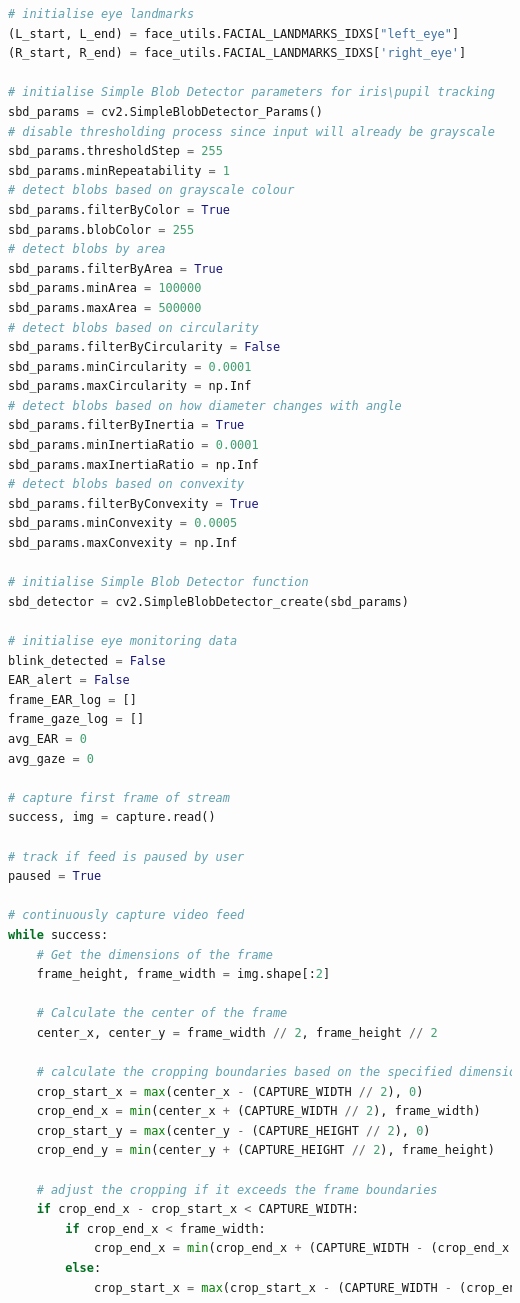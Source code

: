 \documentclass[10pt,conference]{IEEEtran}
\begin{document}
\begin{lstlisting}[language=Python,basicstyle=\tiny, showspaces=false, showstringspaces=false tabsize=1, breaklines=true]
# initialise eye landmarks
(L_start, L_end) = face_utils.FACIAL_LANDMARKS_IDXS["left_eye"]
(R_start, R_end) = face_utils.FACIAL_LANDMARKS_IDXS['right_eye']

# initialise Simple Blob Detector parameters for iris\pupil tracking
sbd_params = cv2.SimpleBlobDetector_Params()
# disable thresholding process since input will already be grayscale
sbd_params.thresholdStep = 255
sbd_params.minRepeatability = 1
# detect blobs based on grayscale colour
sbd_params.filterByColor = True
sbd_params.blobColor = 255
# detect blobs by area
sbd_params.filterByArea = True
sbd_params.minArea = 100000
sbd_params.maxArea = 500000
# detect blobs based on circularity
sbd_params.filterByCircularity = False
sbd_params.minCircularity = 0.0001
sbd_params.maxCircularity = np.Inf
# detect blobs based on how diameter changes with angle
sbd_params.filterByInertia = True
sbd_params.minInertiaRatio = 0.0001
sbd_params.maxInertiaRatio = np.Inf
# detect blobs based on convexity
sbd_params.filterByConvexity = True
sbd_params.minConvexity = 0.0005
sbd_params.maxConvexity = np.Inf

# initialise Simple Blob Detector function
sbd_detector = cv2.SimpleBlobDetector_create(sbd_params)

# initialise eye monitoring data
blink_detected = False
EAR_alert = False
frame_EAR_log = []
frame_gaze_log = []
avg_EAR = 0
avg_gaze = 0

# capture first frame of stream
success, img = capture.read()

# track if feed is paused by user
paused = True

# continuously capture video feed
while success:
    # Get the dimensions of the frame
    frame_height, frame_width = img.shape[:2]

    # Calculate the center of the frame
    center_x, center_y = frame_width // 2, frame_height // 2

    # calculate the cropping boundaries based on the specified dimensions
    crop_start_x = max(center_x - (CAPTURE_WIDTH // 2), 0)
    crop_end_x = min(center_x + (CAPTURE_WIDTH // 2), frame_width)
    crop_start_y = max(center_y - (CAPTURE_HEIGHT // 2), 0)
    crop_end_y = min(center_y + (CAPTURE_HEIGHT // 2), frame_height)

    # adjust the cropping if it exceeds the frame boundaries
    if crop_end_x - crop_start_x < CAPTURE_WIDTH:
        if crop_end_x < frame_width:
            crop_end_x = min(crop_end_x + (CAPTURE_WIDTH - (crop_end_x - crop_start_x)), frame_width)
        else:
            crop_start_x = max(crop_start_x - (CAPTURE_WIDTH - (crop_end_x - crop_start_x)), 0)


\end{lstlisting}
\end{document}

